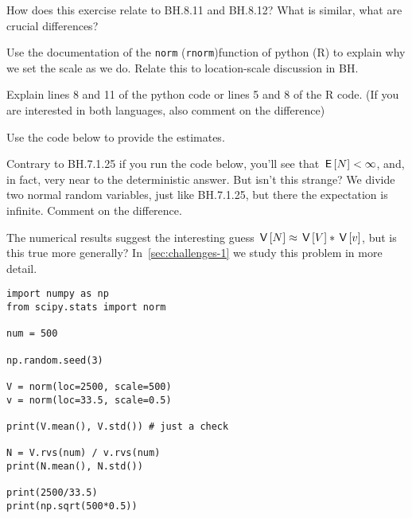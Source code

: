\documentclass[assignments]{subfiles}
\begin{document}
\begin{exercise}\label{ex:2}
 How does this exercise relate to BH.8.11 and BH.8.12? What is similar, what are crucial differences?
\end{exercise}

\begin{exercise}
Use the documentation of the \texttt{norm} (\texttt{rnorm})function of python (R) to explain why we set the scale as we do.
Relate this to location-scale discussion in BH.

\begin{solution}
\end{solution}
\end{exercise}

\begin{exercise}
Explain lines 8 and 11 of the python code or lines 5 and 8 of the R code. (If you are interested in both languages, also comment on the difference)
\begin{solution}
\end{solution}
\end{exercise}

\begin{exercise}
Use the code below to provide the estimates.
\begin{solution}
\end{solution}
\end{exercise}

\begin{exercise}
Contrary to BH.7.1.25 if you run the code below, you'll see that $\,\mathsf{E}\left[N\right] < \infty$, and, in fact, very near to the deterministic answer.
But isn't this strange?
We divide two normal random variables, just like BH.7.1.25, but there the expectation is infinite.
Comment on the difference.
\begin{solution}
\end{solution}
\end{exercise}


The numerical results suggest the interesting guess $\,\mathsf{V}\left[N\right] \approx \,\mathsf{V}\left[V\right] * \,\mathsf{V}\left[v\right]$, but is this true more generally?
In~\cref{sec:challenges-1} we study this problem in more detail.

\begin{verbatim}
import numpy as np
from scipy.stats import norm

num = 500

np.random.seed(3)

V = norm(loc=2500, scale=500)
v = norm(loc=33.5, scale=0.5)

print(V.mean(), V.std()) # just a check

N = V.rvs(num) / v.rvs(num)
print(N.mean(), N.std())

print(2500/33.5)
print(np.sqrt(500*0.5))
\end{verbatim}
\end{document}

